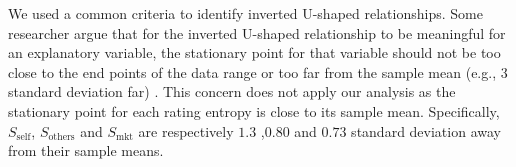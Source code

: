 \documentclass[msom,blindrev]{informs3}
\begin{document}
We used a common criteria to identify inverted U-shaped relationships.  Some researcher argue that for the inverted U-shaped relationship to be meaningful for an explanatory variable, the stationary point for that variable should not be too close to the end points of the data range or too far from the sample mean (e.g., 3 standard deviation far) \cite{lind2010or}. This concern does not apply our analysis as the stationary point for each rating entropy is close to its sample mean. Specifically, $S_{\text{self}}$, $S_{\text{others}}$ and $S_{\text{mkt}}$ are respectively $1.3$ ,$0.80$ and  $0.73$  standard deviation away from their sample means.






%


%
%
\end{document}
